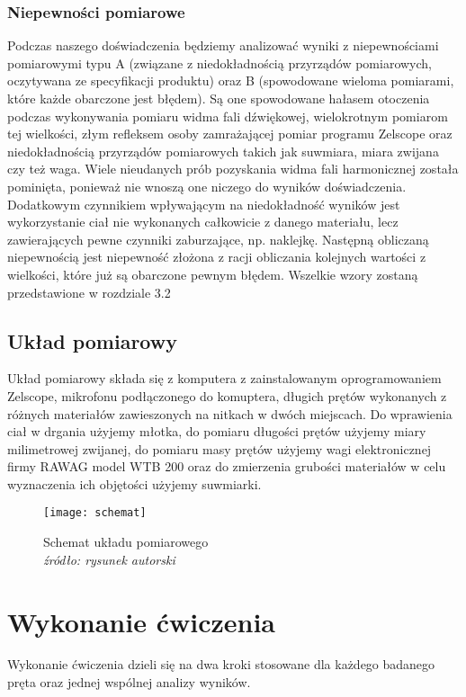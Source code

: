 \documentclass[a4paper,12pts]{article}
\begin{document}
\subsubsection{Niepewności pomiarowe}
Podczas naszego doświadczenia będziemy analizować wyniki z niepewnościami pomiarowymi typu A (związane z niedokładnością przyrządów pomiarowych, oczytywana ze specyfikacji produktu) oraz B (spowodowane wieloma pomiarami, które każde obarczone jest błędem). Są one spowodowane hałasem otoczenia podczas wykonywania pomiaru widma fali dźwiękowej, wielokrotnym pomiarom tej wielkości, złym refleksem osoby zamrażającej pomiar programu Zelscope oraz niedokładnością przyrządów pomiarowych takich jak suwmiara, miara zwijana czy też waga. Wiele nieudanych prób pozyskania widma fali harmonicznej została pominięta, ponieważ nie wnoszą one niczego do wyników doświadczenia. Dodatkowym czynnikiem wpływającym na niedokładność wyników jest wykorzystanie ciał nie wykonanych całkowicie z danego materiału, lecz zawierających pewne czynniki zaburzające, np. naklejkę. Następną obliczaną niepewnością jest niepewność złożona z racji obliczania kolejnych wartości z wielkości, które już są obarczone pewnym błędem. Wszelkie wzory zostaną przedstawione w rozdziale 3.2


\subsection{Układ pomiarowy}
Układ pomiarowy składa się z komputera z zainstalowanym oprogramowaniem Zelscope, mikrofonu podłączonego do komuptera, długich prętów wykonanych z różnych materiałów zawieszonych na nitkach w dwóch miejscach. Do wprawienia ciał w drgania użyjemy młotka, do pomiaru długości prętów użyjemy miary milimetrowej zwijanej, do pomiaru masy prętów użyjemy wagi elektronicznej firmy RAWAG model WTB 200 oraz do zmierzenia grubości materiałów w celu wyznaczenia ich objętości użyjemy suwmiarki.

\begin{figure}[!h]
	\centering
	\texttt{[image: schemat]}
	\caption{Schemat układu pomiarowego \\ \textit{źródło: rysunek autorski} }
	\label{schematUkladu}
\end{figure}


\newpage \section{Wykonanie ćwiczenia}
Wykonanie ćwiczenia dzieli się na dwa kroki stosowane dla każdego badanego pręta oraz jednej wspólnej analizy wyników.
\end{document}
